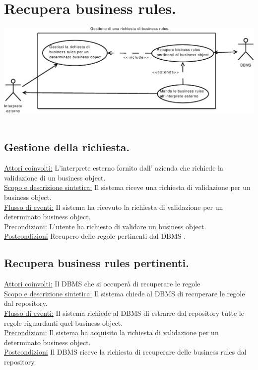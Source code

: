 \documentclass[11pt,titlepage,a4paper]{report}
\begin{document}
\section{Recupera business rules.}
\begin{center}
 \includegraphics[width=1\textwidth]{Recupera-regole.eps}\
\end{center}

\subsection{Gestione della richiesta.}
\underline{Attori coinvolti:} L'interprete esterno fornito dall' azienda che richiede la validazione di un business object.\\
\underline{Scopo e descrizione sintetica:} Il sistema riceve una richiesta di validazione per un business object.\\
\underline{Flusso di eventi:} Il sistema ha ricevuto la richiesta di validazione per un determinato business object.\\
\underline{Precondizioni:} L'utente ha richiesto di validare un business object.\\
\underline{Postcondizioni} Recupero delle regole pertinenti dal DBMS .

\subsection{Recupera business rules pertinenti.}
\underline{Attori coinvolti:} Il DBMS che si occuper\`a di recuperare le regole\\
\underline{Scopo e descrizione sintetica:} Il sistema chiede al DBMS di recuperare le regole dal repository.\\
\underline{Flusso di eventi:} Il sistema richiede al DBMS di estrarre dal repository tutte le regole riguardanti quel business object.\\
\underline{Precondizioni:} Il sistema ha acquisito la richiesta di validazione per un determinato business object.\\
\underline{Postcondizioni} Il DBMS riceve la richiesta di recuperare delle business rules dal repository.
\end{document}
